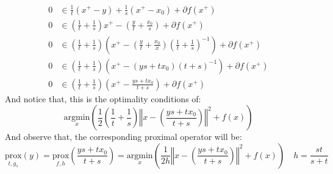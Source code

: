 \documentclass[]{article}
\begin{document}
        \begin{align*}\tag{2a2}\label{eqn:2a2}
            0 &\in \frac{1}{t}(x^+ - y) + \frac{1}{s}(x^+ - x_0) + \partial f(x^+) 
            \\
            0 &\in \left(
                \frac{1}{t} + \frac{1}{s}
            \right)x^+ 
            -
            \left(
                \frac{y}{t} + \frac{x_0}{s}
            \right)
            + 
            \partial f(x^+)
            \\
            0 &\in \left(
                \frac{1}{t} + \frac{1}{s}
            \right)
            \left(
                x^+ - \left(
                    \frac{y}{t} + \frac{x_0}{x}
                \right)
                \left(
                    \frac{1}{t} + \frac{1}{s}
                \right)^{-1}
            \right)
            + \partial f(x^+)
            \\
            0 &\in \left(
                \frac{1}{t} + \frac{1}{s}
            \right)
            \left(
                x^+ - \left(
                    ys + tx_0
                \right)
                \left(
                    t + s
                \right)^{-1}
            \right)
            + \partial f(x^+)
            \\
            0 &\in \left(
                \frac{1}{t} + \frac{1}{s}
            \right)
            \left(
                x^+ - \frac{ys + tx_0}{t + s}
            \right)
            + \partial f(x^+)
        \end{align*}
        And notice that, this is the optimality conditions of: 
        \begin{equation*}\tag{2a3}\label{eqn:2a3}
            \underset{x}{\text{argmin}}
            \left(
                \frac{1}{2}
                \left(
                    \frac{1}{t} + \frac{1}{s}
                \right)
                \left\Vert x - \left(
                    \frac{ys + tx_0}{t + s}
                \right)\right\Vert^2
                + f(x)
            \right)
        \end{equation*}
        And observe that, the corresponding proximal operator will be: 
        \begin{equation*}\tag{2a4}\label{eqn:2a4}
            \underset{t, g_s}{\text{prox}}(y) = 
            \underset{f, h}{\text{prox}}
            \left(
                \frac{ys + tx_0}{t + s}
            \right)
            = 
            \underset{x}{\text{argmin}}
            \left(
                \frac{1}{2h}\left\Vert x - \left(
                    \frac{ys + tx_0}{t + s}
                \right)\right\Vert^2
                + f(x)
            \right)
            \quad h = 
                \frac{st}{s + t}
        \end{equation*}
\end{document}
